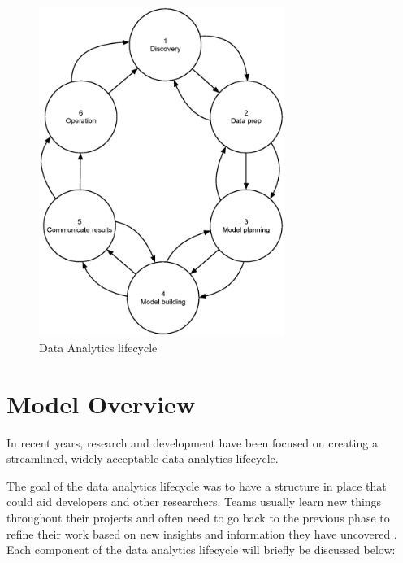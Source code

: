 \begin{figure}[htbp]
\centering
\includegraphics[width=8cm]{./figures/datalifecycle.eps}
\caption{Data Analytics lifecycle}
\label{fig:lifecycle}
\end{figure}

\section{Model Overview}

In recent years, research and development have been focused on creating a streamlined, widely acceptable data analytics lifecycle.

The goal of the data analytics lifecycle was to have a structure in place that could aid developers and other researchers. Teams usually learn new things throughout their projects and often need to go back to the previous phase to refine their work based on new insights and information they have uncovered \cite{dietrich2015data}. 
Each component of the data analytics lifecycle will briefly be discussed below:

